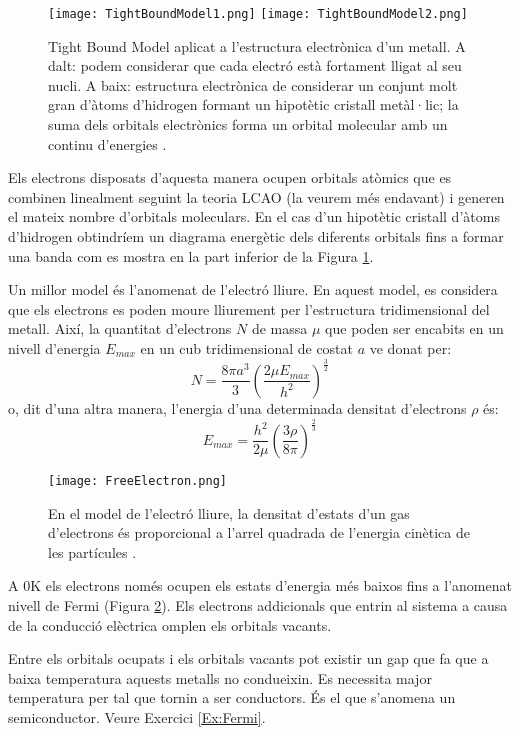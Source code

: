 \begin{figure}[h]
\centering
\texttt{[image: TightBoundModel1.png]}
\texttt{[image: TightBoundModel2.png]}
\caption[Tight Bound Model]{Tight Bound Model aplicat a l'estructura electrònica d'un metall. A dalt: podem considerar que cada electró està fortament lligat al seu nucli. A baix: estructura electrònica de considerar un conjunt molt gran d'àtoms d'hidrogen formant un hipotètic cristall metàl·lic; la suma dels orbitals electrònics forma un orbital molecular  amb un continu d'energies \cite{yen_chemistry_2008}.}
\label{fig:TightBoundModel}
\end{figure}

Els electrons disposats d'aquesta manera ocupen orbitals atòmics que es combinen linealment seguint la teoria LCAO (la veurem més endavant) i generen el mateix nombre d'orbitals moleculars. En el cas d'un hipotètic cristall d'àtoms d'hidrogen obtindríem un diagrama energètic dels diferents orbitals fins a formar una banda com es mostra en la part inferior de la Figura \ref{fig:TightBoundModel}.

Un millor model és l'anomenat de l'electró lliure. 
En aquest model, es considera que els electrons es poden moure lliurement per l'estructura tridimensional del metall. 
Així, la quantitat d'electrons $N$ de massa $\mu$ que poden ser encabits en un nivell d'energia $E_{max}$ en un cub tridimensional de costat $a$ ve donat per:
\[
N=\frac{8 \pi a^3}{3} \left( \frac{2 \mu E_{max}}{h^2} \right)^{\frac{3}{2}}
\]
o, dit d'una altra manera, l'energia d'una determinada densitat d'electrons $\rho$ és:
\[E_{max} = \frac{h^2}{2 \mu} \left( \frac{3 \rho}{8 \pi} \right)^{\frac{2}{3}}\]

\begin{figure}[h]
\centering
\texttt{[image: FreeElectron.png]}
\caption[Model de l'electró lliure]{En el model de l'electró lliure, la densitat d'estats d'un gas d'electrons és proporcional a l'arrel quadrada de l'energia cinètica de les partícules \cite{yen_chemistry_2008}. }
\label{fig:FreeElectron}
\end{figure}

A 0K els electrons només ocupen els estats d'energia més baixos fins a l'anomenat nivell de Fermi (Figura \ref{fig:FreeElectron}). Els electrons addicionals que entrin al sistema a causa de la conducció elèctrica omplen els orbitals vacants.

Entre els orbitals ocupats i els orbitals vacants pot existir un gap que fa que a baixa temperatura aquests metalls no condueixin. Es necessita major temperatura per tal que tornin a ser conductors. 
És el que s'anomena un semiconductor. Veure Exercici \ref{Ex:Fermi}.

